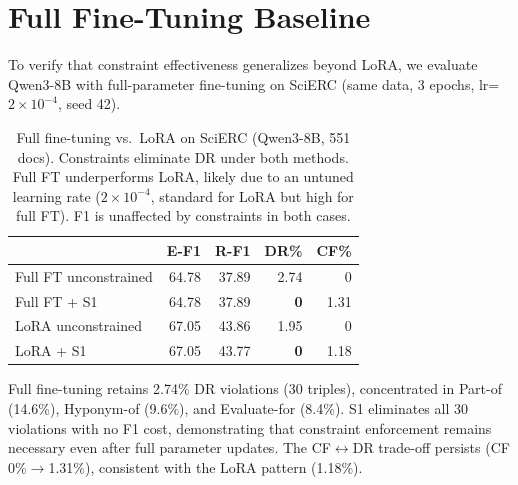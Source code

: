 \section{Full Fine-Tuning Baseline}
\label{app:full-ft}

To verify that constraint effectiveness generalizes beyond LoRA, we evaluate Qwen3-8B with full-parameter fine-tuning on SciERC (same data, 3 epochs, lr=$2{\times}10^{-4}$, seed 42).

\begin{table}[h]
\centering
\small
\begin{tabular}{@{}lrrrr@{}}
\toprule
& \textbf{E-F1} & \textbf{R-F1} & \textbf{DR\%} & \textbf{CF\%} \\
\midrule
Full FT unconstrained & 64.78 & 37.89 & 2.74 & 0 \\
Full FT + S1 & 64.78 & 37.89 & \textbf{0} & 1.31 \\
\midrule
LoRA unconstrained & 67.05 & 43.86 & 1.95 & 0 \\
LoRA + S1 & 67.05 & 43.77 & \textbf{0} & 1.18 \\
\bottomrule
\end{tabular}
\caption{Full fine-tuning vs.\ LoRA on SciERC (Qwen3-8B, 551 docs). Constraints eliminate DR under both methods. Full FT underperforms LoRA, likely due to an untuned learning rate ($2{\times}10^{-4}$, standard for LoRA but high for full FT). F1 is unaffected by constraints in both cases.}
\label{tab:full-ft}
\end{table}

Full fine-tuning retains 2.74\% DR violations (30 triples), concentrated in Part-of (14.6\%), Hyponym-of (9.6\%), and Evaluate-for (8.4\%). S1 eliminates all 30 violations with no F1 cost, demonstrating that constraint enforcement remains necessary even after full parameter updates. The CF$\leftrightarrow$DR trade-off persists (CF 0\%$\to$1.31\%), consistent with the LoRA pattern (1.18\%).

